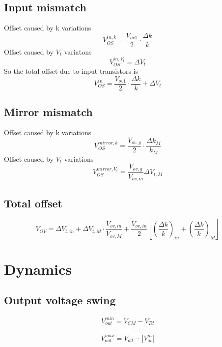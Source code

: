 \subsection{Input mismatch}
Offset caused by k variations
\begin{equation}
V_{OS}^{in,k}=\frac{V_{ov1}}{2}\cdot \frac{\Delta k}{k}
\end{equation}
Offset caused by $V_t$ variatons
\begin{equation}
V_{OS}^{in,V_t}=\Delta V_t
\end{equation}
So the total offset due to input transistors is 
\begin{equation}
V_{OS}^{in}=\frac{V_{ov1}}{2}\cdot \frac{\Delta k}{k}+\Delta V_t
\end{equation}
\subsection{Mirror mismatch}
Offset caused by k variations
\begin{equation}
V_{OS}^{mirror,k}=\frac{V_{ov,g}}{2}\cdot\frac{\Delta k_M}{k_M}
\end{equation}
Offset caused by $V_t$ variations 
\begin{equation}
V_{OS}^{mirror,V_t}=\frac{V_{ov,g}}{V_{ov,m}}\Delta V_{t,M}
\end{equation}
\subsection{Total offset}
\begin{equation}
V_{OV}=\Delta V_{t,in} +\Delta V_{t,M}\cdot \frac{V_{ov,in}}{V_{ov,M}}+\frac{V_{ov,in}}{2}[(\frac{\Delta k}{k})_{in}+(\frac{\Delta k}{k})_M]
\end{equation}




\section{Dynamics}
\subsection{Output voltage swing}
\begin{equation}
V_{out}^{min}=V_{CM}-V_{Td}
\end{equation}
\\
\begin{equation}
V_{out}^{max}=V_{dd}-|V_{ov}^{m}|
\end{equation}

